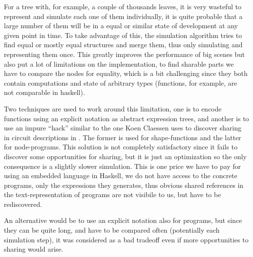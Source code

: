 \label{monadic:sharing}


    For a tree with, for example, a couple of thousands leaves, it is
    very wasteful to represent and simulate each one of them
    individually, it is quite probable that a large number of them
    will be in a equal or similar state of development at any given
    point in time. To take advantage of this, the simulation algorithm
    tries to find equal or mostly equal structures and merge them,
    thus only simulating and representing them once. This greatly
    improves the performance of big scenes but also put a lot of
    limitations on the implementation, to find sharable parts we have
    to compare the nodes for equality, which is a bit challenging
    since they both contain computations and state of arbitrary types
    (functions, for example, are not comparable in haskell). 

    Two techniques are used to work around this limitation, one is to
    encode functions using an explicit notation as abstract
    expression trees, and another is to use an impure ``hack'' similar
    to the one Koen Claessen uses to discover sharing in circuit
    descriptions in \cite{obs_sharing}.  The former is used for
    shape-functions and the latter for node-programs. This solution is
    not completely satisfactory since it fails to discover some
    opportunities for sharing, but it is just an optimization so the
    only consequence is a slightly slower simulation. This is one
    price we have to pay for using an embedded language in Haskell, we
    do not have access to the concrete programs, only the expressions
    they generates, thus obvious shared references in the
    text-representation of programs are not visibile to us, but
    have to be rediscovered.

    An alternative would be to use an explicit notation also for
    programs, but since they can be quite long, and have to be
    compared often (potentially each simulation step), it was
    considered as a bad tradeoff even if more opportunities to sharing
    would arise. 

